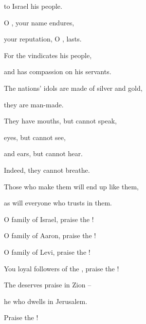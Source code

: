 {to Israel
his people.
\par }{\Q {}O
{}, your name
endures,
\par }{\Q your reputation, O
{}, lasts.
\par }{\Q {}For
the {}
vindicates
his people,
\par }{\Q and has compassion
on
his servants.
\par }{\Q {}The nations’
idols are made of silver
and gold,
\par }{\Q they are man-made.
\par }{\Q {}They have mouths,
but cannot
speak,
\par }{\Q eyes,
but cannot
see,
\par }{\Q {}and ears,
but cannot hear.
\par }{\Q Indeed,
they
cannot breathe.
\par }{\Q {}Those who make
them will end up like
them,
\par }{\Q as will everyone
who
trusts in them.
\par }{\Q {}O family
of Israel,
praise
the {}!
\par }{\Q O family
of Aaron,
praise
the {}!
\par }{\Q {}O family
of Levi,
praise
the {}!
\par }{\Q You loyal followers
of the {}, praise
the {}!
\par }{\Q {}The
{}
deserves
praise in Zion –
\par }{\Q he who dwells
in Jerusalem.
\par }{\Q Praise
the
{}!


}
